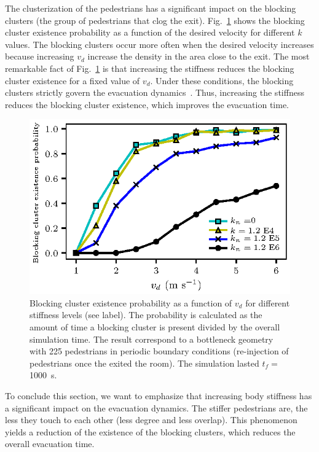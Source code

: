 \documentclass[preprint,12pt]{elsarticle}
\begin{document}
The clusterization of the pedestrians has a significant impact on the blocking clusters (the group of pedestrians that clog the exit).  Fig.~\ref{pbc_vs_vd_multi_kn} shows the blocking cluster existence probability as a function of the desired velocity for different $k$ values. The blocking clusters occur more often when the desired velocity increases because increasing $v_d$ increase the density in the area close to the exit. The most remarkable fact of Fig.~\ref{pbc_vs_vd_multi_kn} is that increasing the stiffness reduces the blocking cluster existence for a fixed value of $v_d$. Under these conditions, the blocking clusters strictly govern the evacuation dynamics~\cite{dorso_2005}. Thus, increasing the stiffness reduces the blocking cluster existence, which improves the evacuation time.\\

\begin{figure}[htbp!]
\centering
\includegraphics[width=0.7\columnwidth]
{./pbc_vs_vd_multi_kn.eps}
\caption{\label{pbc_vs_vd_multi_kn} Blocking cluster existence probability as a function of $v_d$ for different stiffness levels (see label). The probability is calculated as the amount of time a blocking cluster is present divided by the overall simulation time. The result correspond to a bottleneck geometry with 225 pedestrians in periodic boundary conditions (re-injection of pedestrians once the exited the room). The simulation lasted $t_f =$ 1000~s. }
\end{figure}


To conclude this section, we want to emphasize that increasing body stiffness has a significant impact on the evacuation dynamics. The stiffer pedestrians are, the less they touch to each other (less degree and less overlap). This phenomenon yields a reduction of the existence of the blocking clusters, which reduces the overall evacuation time. \\
\\
\end{document}
